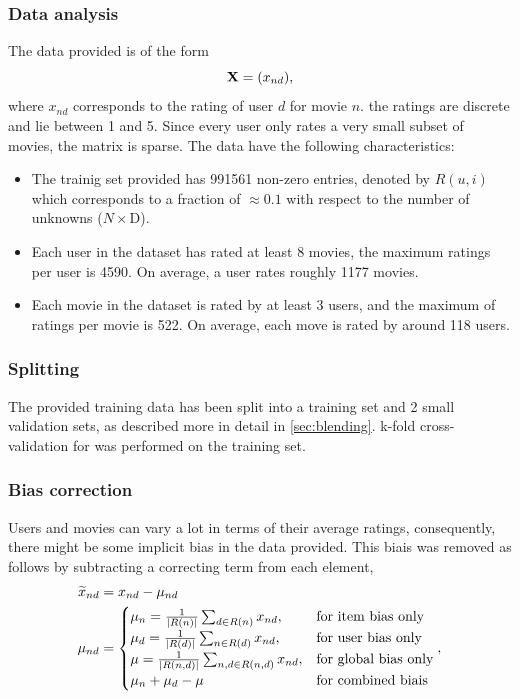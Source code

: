 \subsubsection{Data analysis}

The data provided is of the form 
\begin{equation}
  \mathbf{X} = (x_{nd}),
\end{equation}
where $x_{nd}$ corresponds to the rating of user $d$ for movie $n$.  
the ratings are discrete and lie between 1 and 5. Since every user only rates a
very small subset of movies, the matrix is sparse. The data have the following
characteristics:

\begin{itemize}
  \item The trainig set provided has 991561 non-zero entries, denoted by $R(u,i)$ which corresponds to 
a fraction of $\approx 0.1$ with respect to the number of unknowns ($N \times $D). 
  \item Each user in the dataset has rated at least 8 movies, the maximum
    ratings per user is 4590. On average, a user rates roughly 1177 movies.
  \item Each movie in the dataset is rated by at least 3 users, and the maximum
    of ratings per movie is 522. On average, each move is rated by around 118
    users. 
\end{itemize}

\subsubsection{Splitting}
\label{sec:splitting}

The provided training data has been split into a training set and 2 small 
validation sets, as described more in detail in \ref{sec:blending}. k-fold cross-validation for was performed on the training set.

\subsubsection{Bias correction}
\label{sec:biascorrection}

Users and movies can vary a lot in terms of their average ratings, 
consequently, there might be some implicit bias in
the data provided. 
This biais was removed as follows by subtracting a correcting term from each
element,
\begin{align}
  \widetilde{x}_{nd} &= x_{nd}-\mu_{nd} \\
  \mu_{nd} &=
 \begin{cases}
  \mu_{n} = \inv{|R(n)|} \sum_{d \in R(n)} x_{nd}, &\text{for item bias only}   \\
\mu_{d} = \inv{|R(d)|} \sum_{n \in R(d)} x_{nd}, &\text{for user bias only} \\
\mu = \inv{|R(n,d)|}\sum_{n,d \in R(n,d)} x_{nd}, &\text{for global bias only}
   \\
  \mu_{n} + \mu_{d} - \mu &\text{for combined biais}
 \end{cases}, 
  \label{eq:biases}
\end{align}

